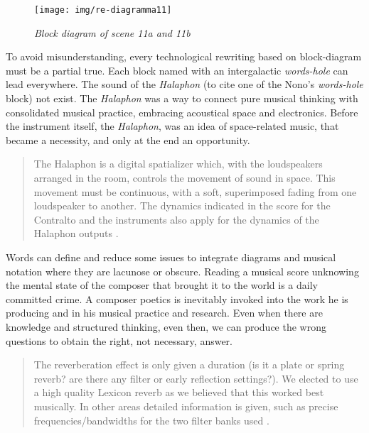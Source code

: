 \documentclass[twoside,a4paper]{article}
\begin{document}
\begin{figure}[ht]
\centerline{\texttt{[image: img/re-diagramma11]}}
\caption{\label{re-dia-6c}{\it Block diagram of scene 11a and 11b}}
\end{figure}

To avoid misunderstanding, every technological rewriting based on block-diagram must be a partial true. Each block named with an intergalactic \emph{words-hole} can lead everywhere. The sound of the \emph{Halaphon} (to cite one of the Nono's \emph{words-hole} block) not exist. The \emph{Halaphon} was a way to connect pure musical thinking with consolidated musical practice, embracing acoustical space and electronics. Before the instrument itself, the \emph{Halaphon}, was an idea of space-related music, that became a necessity, and only at the end an opportunity.

\begin{quote}
The Halaphon is a digital spatializer which, with the loudspeakers arranged in the room, controls the movement of sound in space. This movement must be continuous, with a soft, superimposed fading from one loudspeaker to another. The dynamics indicated in the score for the Contralto and the instruments also apply for the dynamics of the Halaphon outputs \cite{nlre87}. %
\end{quote}

Words can define and reduce some issues to integrate diagrams and musical notation where they are lacunose or obscure. Reading a musical score unknowing the mental state of the composer that brought it to the world is a daily committed crime. A composer poetics is inevitably invoked into the work he is producing and in his musical practice and research. Even when there are knowledge and structured thinking, even then, we can produce the wrong questions to obtain the right, not necessary, answer.

\begin{quote}
The reverberation effect is only given a duration (is it a plate or spring reverb? are there any filter or early reflection settings?). We elected to use a high quality Lexicon reverb as we believed that this worked best musically. In other areas detailed information is given, such as precise frequencies/bandwidths for the two filter banks used \cite{rw05}.
\end{quote}
\end{document}
